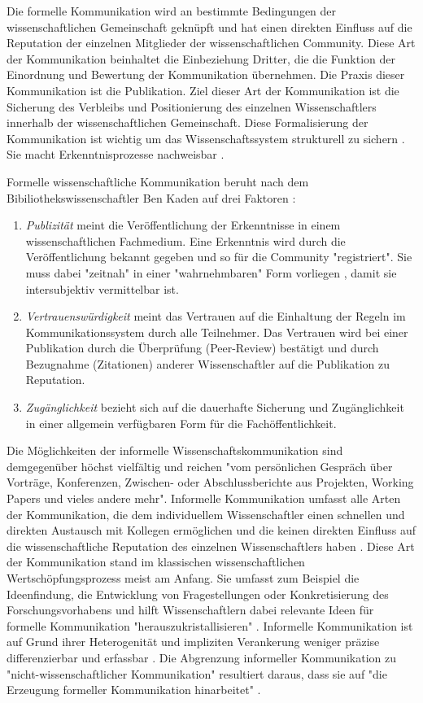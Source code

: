 Die formelle Kommunikation wird an bestimmte Bedingungen der wissenschaftlichen Gemeinschaft geknüpft und hat einen direkten Einfluss auf die Reputation der einzelnen Mitglieder der wissenschaftlichen Community. Diese Art der Kommunikation beinhaltet die Einbeziehung Dritter, die die Funktion der Einordnung und Bewertung der Kommunikation übernehmen. Die Praxis dieser Kommunikation ist die Publikation. Ziel dieser Art der Kommunikation ist die Sicherung des Verbleibs und Positionierung des einzelnen Wissenschaftlers innerhalb der wissenschaftlichen Gemeinschaft. Diese Formalisierung der Kommunikation ist wichtig um das Wissenschaftssystem strukturell zu sichern \cite{kaden_2009_library}. Sie macht Erkenntnisprozesse nachweisbar \cite{kaden_2009_library}.

Formelle wissenschaftliche Kommunikation beruht nach dem Bibiliothekswissenschaftler Ben Kaden auf drei Faktoren \cite{kaden_2009_library}:
\begin{enumerate}
\item \textit{Publizität} meint die Veröffentlichung der Erkenntnisse in einem wissenschaftlichen Fachmedium. Eine Erkenntnis wird durch die Veröffentlichung bekannt gegeben und so für die Community "registriert".  Sie muss dabei "zeitnah" in einer "wahrnehmbaren" Form vorliegen \cite{Schimank_2012}, damit sie intersubjektiv vermittelbar ist.
\item \textit{Vertrauenswürdigkeit} meint das Vertrauen auf die Einhaltung der Regeln im Kommunikationssystem durch alle Teilnehmer. Das Vertrauen wird bei einer Publikation durch die Überprüfung (Peer-Review) bestätigt und durch Bezugnahme (Zitationen) anderer Wissenschaftler auf die Publikation zu Reputation.
\item \textit{Zugänglichkeit} bezieht sich auf die dauerhafte Sicherung und Zugänglichkeit in einer allgemein verfügbaren Form für die Fachöffentlichkeit.
\end{enumerate}

Die Möglichkeiten der informelle Wissenschaftskommunikation sind demgegenüber höchst vielfältig und reichen "vom persönlichen Gespräch über Vorträge, Konferenzen, Zwischen- oder Abschlussberichte aus Projekten, Working Papers und vieles andere mehr"\cite{Hanekop_2014}. Informelle Kommunikation umfasst alle Arten der Kommunikation, die dem individuellem Wissenschaftler einen schnellen und direkten Austausch mit Kollegen ermöglichen und die keinen direkten Einfluss auf die wissenschaftliche Reputation des einzelnen Wissenschaftlers haben \cite{suchen}. Diese Art der Kommunikation stand im klassischen wissenschaftlichen Wertschöpfungsprozess meist am Anfang. Sie umfasst zum Beispiel die Ideenfindung, die Entwicklung von Fragestellungen oder Konkretisierung des Forschungsvorhabens und hilft Wissenschaftlern dabei relevante Ideen für formelle Kommunikation "herauszukristallisieren" \cite{Hanekop_2014}. Informelle Kommunikation ist auf Grund ihrer Heterogenität und impliziten Verankerung weniger präzise differenzierbar und erfassbar \cite{kaden_2009_library}. Die Abgrenzung informeller Kommunikation zu "nicht-wissenschaftlicher Kommunikation" resultiert daraus, dass sie auf "die Erzeugung formeller Kommunikation hinarbeitet" \cite{kaden_2009_library}.

